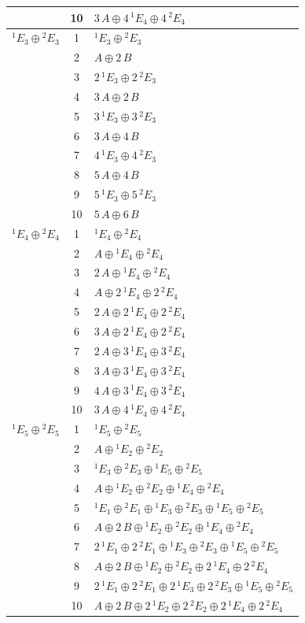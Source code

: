 \documentclass[11pt]{article}
\begin{document}
\begin{longtable}{l c p{}}
 & 10 & $3\,A\oplus 4\,{}^{1}E_{4}\oplus 4\,{}^{2}E_{4}$\\
\hline
${}^{1}E_{3}\oplus {}^{2}E_{3}$ & 1 & ${}^{1}E_{3}\oplus {}^{2}E_{3}$\\
 & 2 & $A\oplus 2\,B$\\
 & 3 & $2\,{}^{1}E_{3}\oplus 2\,{}^{2}E_{3}$\\
 & 4 & $3\,A\oplus 2\,B$\\
 & 5 & $3\,{}^{1}E_{3}\oplus 3\,{}^{2}E_{3}$\\
 & 6 & $3\,A\oplus 4\,B$\\
 & 7 & $4\,{}^{1}E_{3}\oplus 4\,{}^{2}E_{3}$\\
 & 8 & $5\,A\oplus 4\,B$\\
 & 9 & $5\,{}^{1}E_{3}\oplus 5\,{}^{2}E_{3}$\\
 & 10 & $5\,A\oplus 6\,B$\\
\hline
${}^{1}E_{4}\oplus {}^{2}E_{4}$ & 1 & ${}^{1}E_{4}\oplus {}^{2}E_{4}$\\
 & 2 & $A\oplus {}^{1}E_{4}\oplus {}^{2}E_{4}$\\
 & 3 & $2\,A\oplus {}^{1}E_{4}\oplus {}^{2}E_{4}$\\
 & 4 & $A\oplus 2\,{}^{1}E_{4}\oplus 2\,{}^{2}E_{4}$\\
 & 5 & $2\,A\oplus 2\,{}^{1}E_{4}\oplus 2\,{}^{2}E_{4}$\\
 & 6 & $3\,A\oplus 2\,{}^{1}E_{4}\oplus 2\,{}^{2}E_{4}$\\
 & 7 & $2\,A\oplus 3\,{}^{1}E_{4}\oplus 3\,{}^{2}E_{4}$\\
 & 8 & $3\,A\oplus 3\,{}^{1}E_{4}\oplus 3\,{}^{2}E_{4}$\\
 & 9 & $4\,A\oplus 3\,{}^{1}E_{4}\oplus 3\,{}^{2}E_{4}$\\
 & 10 & $3\,A\oplus 4\,{}^{1}E_{4}\oplus 4\,{}^{2}E_{4}$\\
\hline
${}^{1}E_{5}\oplus {}^{2}E_{5}$ & 1 & ${}^{1}E_{5}\oplus {}^{2}E_{5}$\\
 & 2 & $A\oplus {}^{1}E_{2}\oplus {}^{2}E_{2}$\\
 & 3 & ${}^{1}E_{3}\oplus {}^{2}E_{3}\oplus {}^{1}E_{5}\oplus {}^{2}E_{5}$\\
 & 4 & $A\oplus {}^{1}E_{2}\oplus {}^{2}E_{2}\oplus {}^{1}E_{4}\oplus {}^{2}E_{4}$\\
 & 5 & ${}^{1}E_{1}\oplus {}^{2}E_{1}\oplus {}^{1}E_{3}\oplus {}^{2}E_{3}\oplus {}^{1}E_{5}\oplus {}^{2}E_{5}$\\
 & 6 & $A\oplus 2\,B\oplus {}^{1}E_{2}\oplus {}^{2}E_{2}\oplus {}^{1}E_{4}\oplus {}^{2}E_{4}$\\
 & 7 & $2\,{}^{1}E_{1}\oplus 2\,{}^{2}E_{1}\oplus {}^{1}E_{3}\oplus {}^{2}E_{3}\oplus {}^{1}E_{5}\oplus {}^{2}E_{5}$\\
 & 8 & $A\oplus 2\,B\oplus {}^{1}E_{2}\oplus {}^{2}E_{2}\oplus 2\,{}^{1}E_{4}\oplus 2\,{}^{2}E_{4}$\\
 & 9 & $2\,{}^{1}E_{1}\oplus 2\,{}^{2}E_{1}\oplus 2\,{}^{1}E_{3}\oplus 2\,{}^{2}E_{3}\oplus {}^{1}E_{5}\oplus {}^{2}E_{5}$\\
 & 10 & $A\oplus 2\,B\oplus 2\,{}^{1}E_{2}\oplus 2\,{}^{2}E_{2}\oplus 2\,{}^{1}E_{4}\oplus 2\,{}^{2}E_{4}$\\
\hline
\end{longtable}
\end{document}
